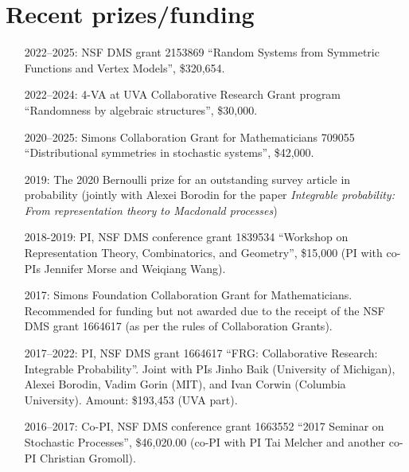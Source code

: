 \documentclass[letterpaper,11pt]{article}
\begin{document}
\section*{Recent prizes/funding}
\begin{itemize}
	\item [2022--2025:]
	NSF DMS grant 2153869
	``Random Systems from Symmetric Functions and Vertex Models'',
	\$320,654.

	\item [2022--2024:]
	4-VA at UVA Collaborative Research Grant program
	``Randomness by algebraic structures'',
	\$30,000.
	\item [2020--2025:]
		Simons Collaboration Grant for Mathematicians 709055
		``Distributional symmetries in stochastic systems'',
		\$42,000.
	\item [2019:]
		The 2020 Bernoulli prize for an outstanding survey article in probability
		(jointly with Alexei Borodin for the paper \emph{Integrable probability: From representation theory to
		Macdonald processes})
	\item
				[2018-2019:]
				PI, NSF DMS conference grant
				1839534
				``Workshop on Representation Theory, Combinatorics, and Geometry'',
				\$15,000
				(PI with co-PIs Jennifer Morse and Weiqiang Wang).
	\item
	      [2017:] Simons Foundation Collaboration Grant for
	      Mathematicians. Recommended for funding but not awarded due to
	      the receipt of the NSF DMS grant 1664617 (as per the rules of Collaboration
	      Grants).
	\item
	      [2017--2022:] PI, NSF DMS grant 1664617
	      ``FRG: Collaborative Research: Integrable Probability''.
	      Joint with PIs Jinho Baik (University of Michigan), Alexei
	      Borodin, Vadim Gorin (MIT), and Ivan Corwin (Columbia University). Amount:
	      \$193,453 (UVA part).
	\item
	      [2016--2017:]
	      Co-PI, NSF DMS conference grant 1663552 ``2017 Seminar on Stochastic
	      Processes'', \$46,020.00 (co-PI with PI Tai Melcher and another co-PI
	      Christian Gromoll).

\end{itemize}
\end{document}
